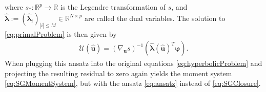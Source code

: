 where $s_*:\mathbb{R}^p\to\mathbb{R}$ is the Legendre transformation of $s$, and $\bm{ \hat\lambda}:=(\bm{\hat{\lambda}}_i)_{|i|\leq M}\in \mathbb{R}^{N \times p}$ are called the dual variables. The solution to \eqref{eq:primalProblem} is then given by
\begin{align}\label{eq:ansatz}
 \mathcal{U}(\bm{\hat u}) = \left( \nabla_{\bm{u}} s \right)^{-1}(\bm{\hat{\lambda}}(\bm{\hat u})^T \bm{\varphi}).
\end{align}
When plugging this ansatz into the original equations \eqref{eq:hyperbolicProblem} and projecting the resulting residual to zero again yields the moment system \eqref{eq:SGMomentSystem}, but with the ansatz \eqref{eq:ansatz} instead of \eqref{eq:SGClosure}.



